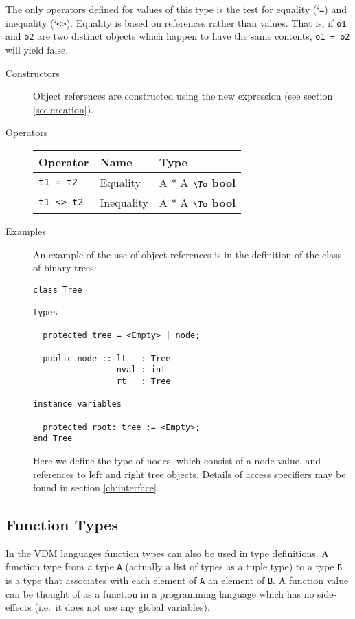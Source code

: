 \documentclass{overturerepchap}
\newcommand{\Lit}[1]{`{\tt #1}\Quote}
\newcommand{\keyw}[1]{{\bf\ttfamily #1}}
\newcommand{\PROD}[2]{#1 * #2}
\newcommand{\TO}[2]{#1 $\To$ #2}
\begin{document}
The only operators defined for values of this type is the test for
equality (\Lit{=}) and inequality (\Lit{<>}). Equality is based on references rather than
values. That is, if \texttt{o1} and \texttt{o2} are two distinct
objects which happen to have the same contents, \texttt{o1 = o2} will
yield false.

\begin{description}
\item[Constructors] Object references are constructed using the new
expression (see section \ref{sec:creation}).

\item[Operators]\mbox{}

  \begin{tabular}{|l|l|l|}\hline
    Operator & Name & Type \\ \hline
    {\tt t1 = t2} & Equality & \TO{\PROD{A}{A}}{\keyw{bool}} \\
    {\tt t1 <> t2} & Inequality & \TO{\PROD{A}{A}}{\keyw{bool}} \\
    \hline
  \end{tabular}

\item[Examples]
An example of the use of object references is in the definition of the
class of binary trees:
\begin{lstlisting}
class Tree

types

  protected tree = <Empty> | node;

  public node :: lt   : Tree
                 nval : int
                 rt   : Tree

instance variables

  protected root: tree := <Empty>;
end Tree
\end{lstlisting}
\label{TreeDef}

Here we define the type of nodes, which consist of a node value, and
references to left and right tree objects.
Details of access specifiers may be found in section
\ref{ch:interface}.
\end{description}

\subsection{Function Types}

In the VDM languages function types can also be used in type
definitions.  A function type from a type {\tt A} (actually a list of
types as a tuple type) to a type {\tt B} is a type that associates with each element
of {\tt A} an element of {\tt B}. A function value can be thought of
as a function in a programming language which has no side-effects
(i.e.\ it does not use any global variables).
\end{document}
